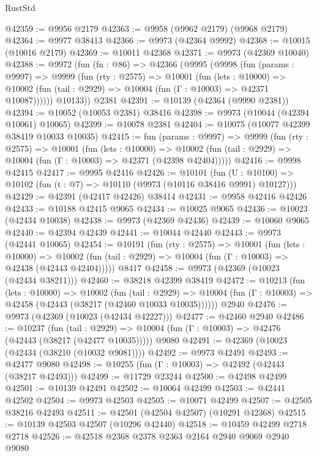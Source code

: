 \begin{lexlean}{RustStd}
\begin{coremodule}
@42359 := @9956 @2179
@42363 := @9958 (@9962 @2179) (@9968 @2179)
@42364 := @9977 @38413
@42366 := @9973 (@42364 @9992)
@42368 := @10015 (@10016 @2179)
@42369 := @10011 @42368
@42371 := @9973 (@42369 @10040)
@42388 := @9972
    (fun (fn : @86) =>
    @42366
      (@9995
        (@9998
          (fun (params : @9997) =>
          @9999
            (fun (rty : @2575) =>
            @10001
              (fun (lets : @10000) =>
              @10002 (fun (tail : @2929) => @10004 (fun (Γ : @10003) => @42371 @10087))))))
        @10133))
    @2381
@42391 := @10139 (@42364 (@9990 @2381))
@42394 := @10052 (@10053 @2381) @38416
@42398 := @9973 (@10044 (@42394 @10061) @10065)
@42399 := @10078 @2381
@42404 := @10075 (@10077 @42399 @38419 @10033 @10035)
@42415 := fun (params : @9997) =>
  @9999
    (fun (rty : @2575) =>
    @10001
      (fun (lets : @10000) =>
      @10002 (fun (tail : @2929) => @10004 (fun (Γ : @10003) => @42371 (@42398 @42404)))))
@42416 := @9998 @42415
@42417 := @9995 @42416
@42426 := @10101
    (fun (U : @10100) => @10102 (fun (t : @7) => @10110 (@9973 (@10116 @38416 @9991) @10127)))
@42429 := @42391 (@42417 @42426) @38414
@42431 := @9958 @42416 @42426
@42433 := @10188 @42415 @9065
@42434 := @10025 @9065
@42436 := @10023 (@42434 @10038)
@42438 := @9973 (@42369 @42436)
@42439 := @10060 @9065
@42440 := @42394 @42439
@42441 := @10044 @42440
@42443 := @9973 (@42441 @10065)
@42454 := @10191
    (fun (rty : @2575) =>
    @10001
      (fun (lets : @10000) =>
      @10002 (fun (tail : @2929) => @10004 (fun (Γ : @10003) => @42438 (@42443 @42404)))))
    @8417
@42458 := @9973 (@42369 (@10023 (@42434 @38211)))
@42460 := @38218 @42399 @38419
@42472 := @10213
    (fun (lets : @10000) =>
    @10002
      (fun (tail : @2929) =>
      @10004 (fun (Γ : @10003) => @42458 (@42443 (@38217 (@42460 @10033 @10035))))))
    @2940
@42476 := @9973 (@42369 (@10023 (@42434 @42227)))
@42477 := @42460 @2940
@42486 := @10237
    (fun (tail : @2929) => @10004 (fun (Γ : @10003) => @42476 (@42443 (@38217 (@42477 @10035)))))
    @9080
@42491 := @42369 (@10023 (@42434 (@38210 (@10032 @9081))))
@42492 := @9973 @42491
@42493 := @42477 @9080
@42498 := @10255 (fun (Γ : @10003) => @42492 (@42443 (@38217 @42493)))
@42499 := @11729 @23244
@42500 := @42498 @42499
@42501 := @10139 @42491
@42502 := @10064 @42499
@42503 := @42441 @42502
@42504 := @9973 @42503
@42505 := @10071 @42499
@42507 := @42505 @38216 @42493
@42511 := @42501 (@42504 @42507) (@10291 @42368)
@42515 := @10139 @42503 @42507 (@10296 @42440)
@42518 := @10459 @42499 @2718 @2718
@42526 := @42518 @2368 @2378 @2363 @2164 @2940 @9069 @2940 @9080

\end{coremodule}
\end{lexlean}
